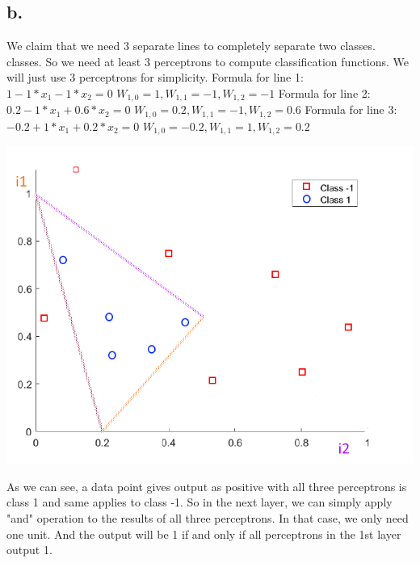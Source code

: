 \documentclass[12pt, letterpaper]{article}
\begin{document}
	\subsection{b.}
	
	We claim that we need 3 separate lines to completely separate two classes. classes. So we need at least 3 perceptrons
	to compute classification functions. We will just use 3 perceptrons for simplicity.\newline
	\newline
	Formula for line 1:\newline
	$1-1*x_{1}-1*x_{2}=0$\newline
	$W_{1,0}=1,W_{1,1}=-1,W_{1,2}=-1$\newline
	Formula for line 2:\newline
	$0.2-1*x_{1}+0.6*x_{2}=0$\newline
	$W_{1,0}=0.2,W_{1,1}=-1,W_{1,2}=0.6$\newline
	Formula for line 3:\newline
	$-0.2+1*x_{1}+0.2*x_{2}=0$\newline
	$W_{1,0}=-0.2,W_{1,1}=1,W_{1,2}=0.2$\newline
	
	\includegraphics[scale=0.6]{"problem-5b-1"}
	
	As we can see, a data point gives output as positive with all three perceptrons is class 1 and same applies to class -1.
	So in the next layer, we can simply apply "and" operation to the results of all three perceptrons. In that case, we only need one unit. And the output will be 1 if and only if all perceptrons in the 1st layer output 1.
	
\end{document}

